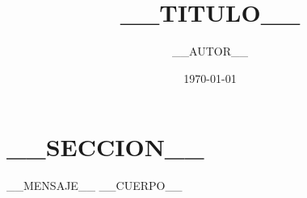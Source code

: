 \documentclass[aspectratio=169,11pt]{beamer}
\title{__TITULO__}
\subtitle{}
\author{__AUTOR__}
\institute{__INSTITUCION__}
\date{\today}
\begin{document}
\begin{frame}[plain]
  \titlepage
\end{frame}

\section{__SECCION__}

\begin{frame}{__MENSAJE__}
  \noindent __CUERPO__
\end{frame}

\begin{frame}[c]
\end{frame}
\end{document}
